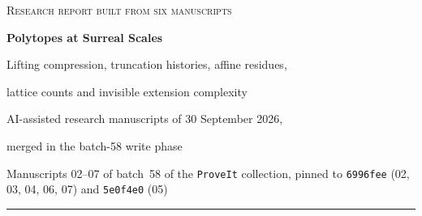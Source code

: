 \documentclass[11pt,a4paper]{article}
\numberwithin{equation}{section}
\theoremstyle{plain}
\newcommand{\R}{\mathbb R}
\newcommand{\repo}{\texttt{ProveIt}}
\begin{document}
\hypersetup{pageanchor=false}
\begin{titlepage}
\thispagestyle{empty}
\vspace*{0.05in}
{\large\scshape Research report built from six manuscripts\par}
\vspace{0.12in}
{\Huge\bfseries Polytopes at Surreal Scales\par}
\vspace{0.18in}
{\Large Lifting compression, truncation histories, affine residues,\par
lattice counts and invisible extension complexity\par}
\vspace{0.14in}
{\large AI-assisted research manuscripts of 30 September 2026,\par
merged in the batch-58 write phase\par}
\vspace{0.04in}
{\small Manuscripts 02--07 of batch~58 of the \repo{} collection, pinned to
\texttt{6996fee} (02, 03, 04, 06, 07) and \texttt{5e0f4e0} (05)\par}
\vspace{0.12in}
\hrule
\vspace{0.1in}
\begin{abstract}
A finite polytope with surreal coordinates has an ordinary real
realizable face lattice: real-closed-field transfer rules out new finite
combinatorial types. What the surreal numbers add is the organization of
that finite geometry across infinitesimal and transfinite scales, and this
report collects six independent answers to the question of how much of it
can be classified. Part~I fixes a real configuration of $n$ points of affine
dimension $d$ and varies only the heights: arbitrary surreal heights
compress to at most $n-d-1$ real layers that keep the leading term of every
real affine-dependence evaluation and every common initial normal-form
history; the complete sign type is an oriented partial flag whose minimum
polynomial germ degree is exactly $m-1$ (or $m-r_0$ with a prescribed
standard part), while finite lifted data need degree at most one. Part~II
shows that truncating the \emph{coordinates} instead is uncontrolled: four
bounded planar points realize every prescribed triangle/quadrilateral
history, and $\omega^{-\omega}$ selects the final hull independently.
Part~III, over any set-sized real closed field $K\supseteq\R$ with its
natural valuation, introduces affine residues and scale lattices and proves
that simultaneous inner segments on a finite rational grid preserve every

\end{abstract}
\end{titlepage}
\end{document}
